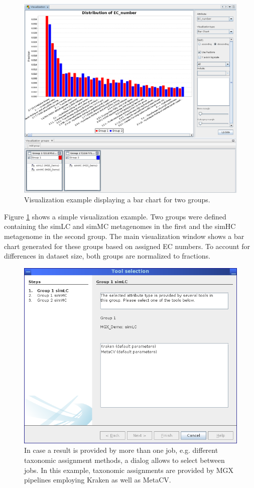 \begin{figure}[H]
\centering
\includegraphics[width=\textwidth]{img/mgx/VizDemo}
\caption[Visualization example]{Visualization example displaying a bar chart for two groups.}
\label{viz3}
\end{figure}

Figure \ref{viz3} shows a simple visualization example. Two groups were defined containing the simLC and simMC metagenomes
in the first and the simHC metagenome in the second group. The main visualization window shows a bar chart
generated for these groups based on assigned EC numbers. To account for differences in dataset size, both
groups are normalized to fractions.

\begin{figure}[H]
\centering
\includegraphics[width=.8\textwidth]{img/mgx/ConflictResolver}
\caption[Job selection]{In case a result is provided by more than one job, e.g. different taxonomic assignment methods,
a dialog allows to select between jobs. In this example, taxonomic assignments are provided by MGX pipelines employing Kraken\cite{KRAKEN}
as well as MetaCV\cite{METACV}.}
\label{viz4}
\end{figure}

